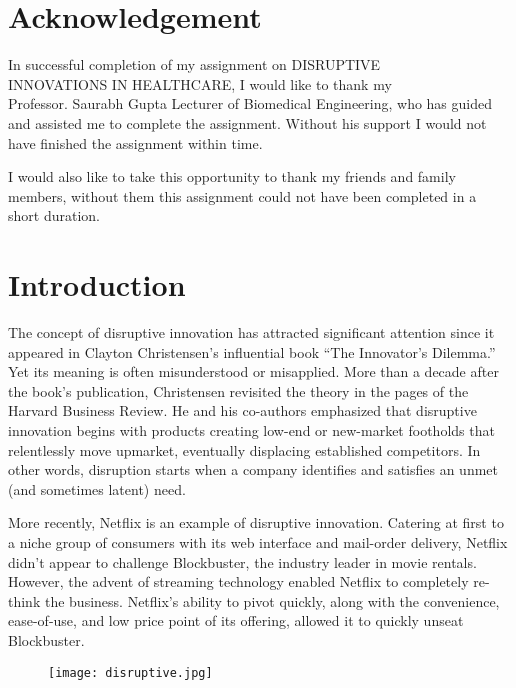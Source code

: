 \documentclass[12pt,a4paper]{article}
\begin{document}
\clearpage
\tableofcontents
\clearpage

\section{Acknowledgement}
\hspace{1cm}
In successful completion of my assignment on DISRUPTIVE\\INNOVATIONS IN HEALTHCARE, I would like to thank my\\Professor. Saurabh Gupta Lecturer of Biomedical Engineering, who has guided and assisted me to complete the assignment. Without his support I would not have finished the assignment within time.


I  would also like to take this opportunity to thank my friends and family members, without them this assignment could not have been completed in a short duration.


\clearpage

\section{Introduction}
\hspace{1cm}
The concept of disruptive innovation has attracted significant attention since it appeared in Clayton Christensen’s influential book “The Innovator’s Dilemma.” Yet its meaning is often misunderstood or misapplied. More than a decade after the book’s publication, Christensen revisited the theory in the pages of the Harvard Business Review. He and his co-authors emphasized that disruptive innovation begins with products creating low-end or new-market footholds that relentlessly move upmarket, eventually displacing established competitors. In other words, disruption starts when a company identifies and satisfies an unmet (and sometimes latent) need.


More recently, Netflix is an example of disruptive innovation. Catering at first to a niche group of consumers with its web interface and mail-order delivery, Netflix didn’t appear to challenge Blockbuster, the industry leader in movie rentals. However, the advent of streaming technology enabled Netflix to completely re-think the business. Netflix’s ability to pivot quickly, along with the convenience, ease-of-use, and low price point of its offering, allowed it to quickly unseat Blockbuster.

\hspace{2cm}


\begin{figure}[h]
\centering
\texttt{[image: disruptive.jpg]}
\end{figure}
\end{document}

